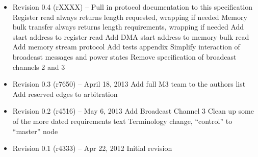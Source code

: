 \documentclass[twoside]{article}
\begin{document}
\begin{itemize}

\item Revision 0.4 {\footnotesize(rXXXX)} --
  \subitem Pull in protocol documentation to this specification
  \subitem Register read always returns length requested, wrapping if needed
  \subitem Memory bulk transfer always returns length requirements, wrapping
  if needed
  \subitem Add start address to register read
  \subitem Add DMA start address to memory bulk read
  \subitem Add memory stream protocol
  \subitem Add tests appendix
  \subitem Simplify interaction of broadcast messages and power states
  \subitem Remove specification of broadcast channels 2 and 3

\item Revision 0.3 {\footnotesize(r7650)} -- April 18, 2013
\subitem Add full M3 team to the authors list
\subitem Add reserved edges to arbitration

\item Revision 0.2 {\footnotesize(r4516)} -- May 6, 2013
\subitem Add Broadcast Channel 3
\subitem Clean up some of the more dated requirements text
\subitem Terminology change, ``control'' to ``master'' node

\item Revision 0.1 {\footnotesize(r4333)} -- Apr 22, 2012
\subitem Initial revision

\end{itemize}

\clearpage
\appendix




\end{document}
